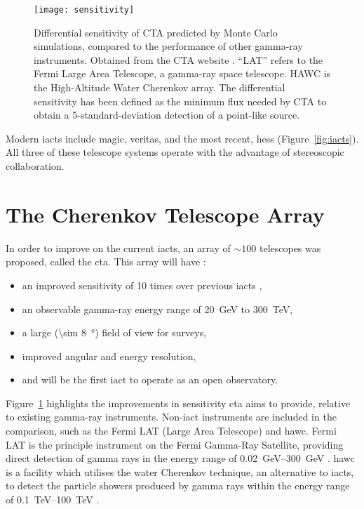 \begin{figure}
	\centering\texttt{[image: sensitivity]} 
	\caption[Differential sensitivity of CTA.]{Differential sensitivity of CTA predicted by Monte Carlo simulations, compared to the performance of other gamma-ray instruments. Obtained from the CTA website \cite{cta-performance}. ``LAT'' refers to the Fermi Large Area Telescope, a gamma-ray space telescope. HAWC is the High-Altitude Water Cherenkov array. The differential sensitivity has been defined as the minimum flux needed by CTA to obtain a 5-standard-deviation detection of a point-like source.}
	\label{fig:sensitivity}
\end{figure}

Modern \glspl{iact} include \gls{magic}, \gls{veritas}, and the most recent, \gls{hess} (Figure~\ref{fig:iacts}). All three of these telescope systems operate with the advantage of stereoscopic collaboration. 

\section{The Cherenkov Telescope Array}

In order to improve on the current \glspl{iact}, an array of ${\sim} 100$ telescopes was proposed, called the \gls{cta}. This array will have \cite{Acharya2013}:
\begin{itemize}
\item an improved sensitivity of 10 times over previous \glspl{iact} ,
\item an observable gamma-ray energy range of \SI{20}{GeV} to \SI{300}{TeV},
\item a large (\SI{\sim 8}{\degree}) field of view for surveys,
\item improved angular and energy resolution,
\item and will be the first \gls{iact} to operate as an open observatory.
\end{itemize}

Figure~\ref{fig:sensitivity} highlights the improvements in sensitivity \gls{cta} aims to provide, relative to existing gamma-ray instruments. Non-\gls{iact} instruments are included in the comparison, such as the Fermi LAT (Large Area Telescope) and \gls{hawc}. Fermi LAT is the principle instrument on the Fermi Gamma-Ray Satellite, providing direct detection of gamma rays in the energy range of \SIrange{0.02}{300}{GeV} \cite{Atwood2009}. \gls{hawc} is a facility which utilises the water Cherenkov technique, an alternative to \glspl{iact}, to detect the particle showers produced by gamma rays within the energy range of \SIrange{0.1}{100}{TeV} \cite{Abeysekara2018}.

